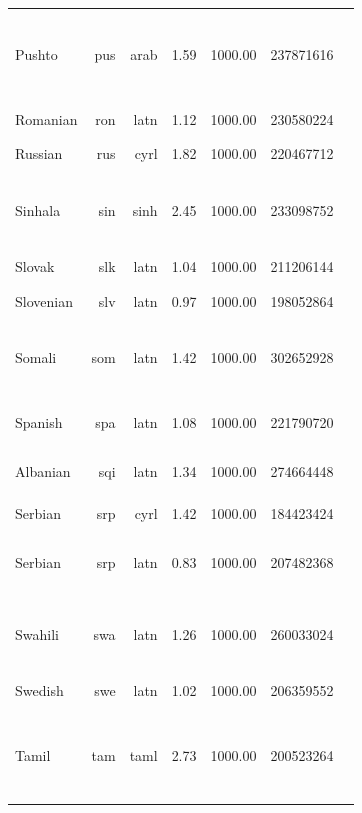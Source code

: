 \documentclass[11pt]{article}
\begin{document}
\begin{center}
\begin{longtable}[width=0.9\textwidth]{|lrrrrrl|}
Pushto & pus & arab & 1.59 & 1000.00 & 237871616 & {\color{oscar}\rule{0.47cm}{8pt}}{\color{nllb}\rule{0.68cm}{8pt}}{\color{madlad400}\rule{2.42cm}{8pt}}{\color{glot500}\rule{0.27cm}{8pt}}{\color{other}\rule{0.16000000000000014cm}{8pt}} \\ 
Romanian & ron & latn & 1.12 & 1000.00 & 230580224 & {\color{oscar}\rule{4.0cm}{8pt}}{\color{other}\rule{0.0cm}{8pt}} \\ 
Russian & rus & cyrl & 1.82 & 1000.00 & 220467712 & {\color{oscar}\rule{4.0cm}{8pt}}{\color{other}\rule{0.0cm}{8pt}} \\ 
Sinhala & sin & sinh & 2.45 & 1000.00 & 233098752 & {\color{oscar}\rule{0.35cm}{8pt}}{\color{nllb}\rule{0.75cm}{8pt}}{\color{madlad400}\rule{2.14cm}{8pt}}{\color{glot500}\rule{0.7599999999999998cm}{8pt}} \\ 
Slovak & slk & latn & 1.04 & 1000.00 & 211206144 & {\color{oscar}\rule{4.0cm}{8pt}} \\ 
Slovenian & slv & latn & 0.97 & 1000.00 & 198052864 & {\color{oscar}\rule{4.0cm}{8pt}} \\ 
Somali & som & latn & 1.42 & 1000.00 & 302652928 & {\color{nllb}\rule{1.23cm}{8pt}}{\color{madlad400}\rule{1.55cm}{8pt}}{\color{glot500}\rule{0.89cm}{8pt}}{\color{other}\rule{0.3299999999999996cm}{8pt}} \\ 
Spanish & spa & latn & 1.08 & 1000.00 & 221790720 & {\color{oscar}\rule{3.99cm}{8pt}}{\color{other}\rule{0.009999999999999787cm}{8pt}} \\ 
Albanian & sqi & latn & 1.34 & 1000.00 & 274664448 & {\color{oscar}\rule{2.51cm}{8pt}}{\color{glot500}\rule{1.4900000000000002cm}{8pt}} \\ 
Serbian & srp & cyrl & 1.42 & 1000.00 & 184423424 & {\color{oscar}\rule{4.0cm}{8pt}} \\ 
Serbian & srp & latn & 0.83 & 1000.00 & 207482368 & {\color{oscar}\rule{0.03cm}{8pt}}{\color{glot500}\rule{3.96cm}{8pt}}{\color{other}\rule{0.010000000000000231cm}{8pt}} \\ 
Swahili & swa & latn & 1.26 & 1000.00 & 260033024 & {\color{oscar}\rule{0.01cm}{8pt}}{\color{madlad400}\rule{2.32cm}{8pt}}{\color{glot500}\rule{1.42cm}{8pt}}{\color{other}\rule{0.25000000000000044cm}{8pt}} \\ 
Swedish & swe & latn & 1.02 & 1000.00 & 206359552 & {\color{oscar}\rule{4.0cm}{8pt}}{\color{other}\rule{0.0cm}{8pt}} \\ 
Tamil & tam & taml & 2.73 & 1000.00 & 200523264 & {\color{oscar}\rule{1.34cm}{8pt}}{\color{nllb}\rule{0.79cm}{8pt}}{\color{madlad400}\rule{1.44cm}{8pt}}{\color{glot500}\rule{0.42cm}{8pt}}{\color{other}\rule{0.010000000000000231cm}{8pt}} \\ 

\end{longtable}
\end{center}
\end{document}

